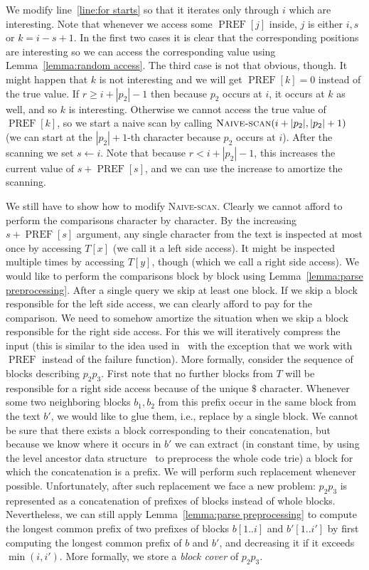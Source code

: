 \documentclass[runningheads]{llncs}
\newcommand{\proc}[1]{\textnormal{\scshape#1}}
\DeclareMathOperator{\PREF}{PREF}
\begin{document}
We modify line~\ref{line:for starts} so that it iterates only through $i$ which are interesting. Note that whenever we access some $\PREF[j]$ inside,
$j$ is either $i, s$ or $k=i-s+1$. In the first two cases it is clear that the corresponding positions are interesting so we can access the corresponding
value using Lemma~\ref{lemma:random access}. The third case is not that obvious, though. It might happen that $k$ is not interesting and we will
get $\PREF[k]=0$ instead of the true value. If $r\geq i+|p_{2}|-1$ then because $p_{2}$ occurs at $i$, it occurs at $k$ as well, and so $k$ is interesting.
Otherwise we cannot access the true value of $\PREF[k]$, so we start a naive scan by calling $\proc{Naive-scan}(i+|p_{2}|,|p_{2}|+1)$ (we can start
at the $|p_{2}|+1$-th character because $p_{2}$ occurs at $i$). After the scanning we set $s\gets i$. Note that because $r<i+|p_{2}|-1$, this
increases the current value of $s+\PREF[s]$, and we can use the increase to amortize the scanning.

We still have to show how to modify \proc{Naive-scan}. Clearly we cannot afford to perform the comparisons character by character. By the increasing
$s+\PREF[s]$ argument, any single character from the text is inspected at most once by accessing $T[x]$ (we call it a left side access). It might be inspected multiple  times by accessing $T[y]$, though (which we call a right side access). We would like to perform the comparisons block by block using Lemma~\ref{lemma:parse preprocessing}. After a single query we skip at least one block. If we skip a block responsible 
for the left side access, we can clearly afford to pay for the comparison. We need to somehow amortize the situation when we skip a block
responsible for the right side access. For this we will iteratively compress the input (this is similar to the idea used in~\cite{GasieniecFully} with the exception that we work with $\PREF$ instead of the failure function). 
More formally, consider the sequence of blocks describing $p_{2} p_{3}$. First note that no further blocks from $T$ will be responsible for a right side access because of the unique $\$$ character. Whenever some two neighboring blocks $b_{1}, b_{2}$ from this prefix occur in the same block from the text $b'$, we would like to glue them, i.e., replace by a single block. We cannot be sure that there exists a block corresponding to their concatenation, but because we know where it occurs in $b'$ we can extract (in constant time, by using the level ancestor data structure~\cite{BenderAncestor} to preprocess the whole code trie) a block for which the concatenation is a prefix. We will perform such replacement whenever possible. Unfortunately, after such replacement we face a new problem: $p_2 p_3$ is represented as a concatenation of prefixes of blocks instead of whole blocks. Nevertheless, we can still apply Lemma~\ref{lemma:parse preprocessing} to compute the longest common prefix of two prefixes
of blocks $b[1..i]$ and $b'[1..i']$ by first computing the longest common prefix of $b$ and $b'$, and decreasing it if it exceeds $\min(i,i')$.
More formally, we store a \emph{block cover} of $p_2 p_3$.
\end{document}
